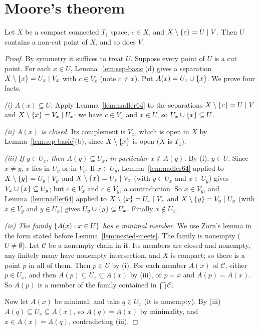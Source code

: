 
\section{Moore's theorem}

\begin{theorem}[Moore]\label{thm:noncut-side}
Let $X$ be a compact connected $T_1$ space, $c\in X$, and $X\setminus\left\{ c \right\}=U\mid V$. Then $U$
contains a non-cut point of $X$, and so does $V$.
\end{theorem}

\begin{proof}
By symmetry it suffices to treat $U$. Suppose every point of $U$ is a cut point. For each $x\in U$,
Lemma~\ref{lem:sep-basic}(d) gives a separation $X\setminus\left\{ x \right\}=U_x\mid V_x$ with $c\in V_x$ (note
$c\neq x$). Put $A(x)=U_x\cup\left\{ x \right\}$. We prove four facts.

\emph{(i) $A(x)\subseteq U$.} Apply Lemma~\ref{lem:nadler64} to the separations $X\setminus\left\{ c \right\}=U\mid V$ and $X\setminus\left\{ x \right\}=V_x\mid U_x$: we have $c\in V_x$ and $x\in U$, so $U_x\cup\left\{ x \right\}\subseteq
U$.

\emph{(ii) $A(x)$ is closed.} Its complement is $V_x$, which is open in $X$ by
Lemma~\ref{lem:sep-basic}(b), since $X\setminus\left\{ x \right\}$ is open ($X$ is $T_1$).

\emph{(iii) If $y\in U_x$, then $A(y)\subseteq U_x$; in particular $x\notin A(y)$.} By (i), $y\in U$. Since
$x\neq y$, $x$ lies in $U_y$ or in $V_y$. If $x\in U_y$, Lemma~\ref{lem:nadler64} applied to
$X\setminus\left\{ y \right\}=U_y\mid V_y$ and $X\setminus\left\{ x \right\}=U_x\mid V_x$ (with $y\in U_x$ and $x\in U_y$) gives
$V_x\cup\left\{ x \right\}\subseteq U_y$; but $c\in V_x$ and $c\in V_y$, a contradiction. So $x\in V_y$, and
Lemma~\ref{lem:nadler64} applied to $X\setminus\left\{ x \right\}=U_x\mid V_x$ and $X\setminus\left\{ y \right\}=V_y\mid U_y$
(with $x\in V_y$ and $y\in U_x$) gives $U_y\cup\left\{ y \right\}\subseteq U_x$. Finally $x\notin U_x$.

\emph{(iv) The family $\left\{ A(x):x\in U \right\}$ has a minimal member.} We use Zorn's lemma in the form stated before
Lemma~\ref{lem:nested-meets}. The family is nonempty ($U\neq\emptyset$). Let $\mathcal C$ be a
nonempty chain in it. Its members are closed and nonempty, any finitely many have nonempty
intersection, and $X$ is compact; so there is a point $p$ in all of them. Then $p\in U$ by (i). For
each member $A(x)$ of $\mathcal C$, either $p\in U_x$, and then $A(p)\subseteq U_x\subseteq A(x)$ by (iii),
or $p=x$ and $A(p)=A(x)$. So $A(p)$ is a member of the family contained in $\bigcap\mathcal C$.

Now let $A(x)$ be minimal, and take $q\in U_x$ (it is nonempty). By (iii) $A(q)\subseteq U_x\subseteq
A(x)$, so $A(q)=A(x)$ by minimality, and $x\in A(x)=A(q)$, contradicting (iii).
\end{proof}

